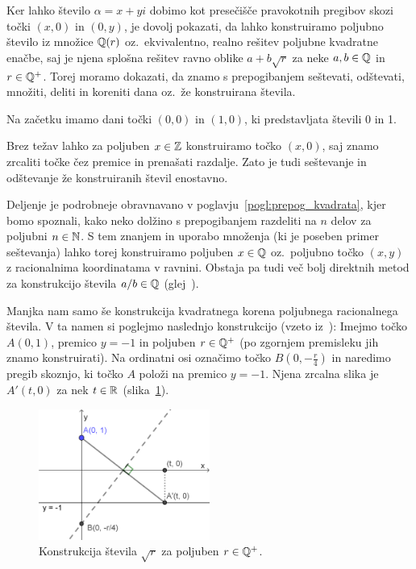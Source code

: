 \begin{dokaz}
    Ker lahko število $\alpha = x + y i$ dobimo kot presečišče pravokotnih pregibov skozi točki $(x, 0)$ in $(0, y)$, je dovolj pokazati, da lahko konstruiramo poljubno število iz množice $\mathbb Q(r)$ oz.\ ekvivalentno, realno rešitev poljubne kvadratne enačbe, saj je njena splošna rešitev ravno oblike $a + b\sqrt{r} $ za neke $ a, b \in \mathbb Q$ in $r \in \mathbb Q^{+}$. Torej moramo dokazati, da znamo s prepogibanjem seštevati, odštevati, množiti, deliti in koreniti dana oz.\ že konstruirana števila.
    
    Na začetku imamo dani točki $(0, 0)$ in $(1, 0)$, ki predstavljata števili 0 in 1. 
    
    
    Brez težav lahko za poljuben $x \in \mathbb Z$ konstruiramo točko $(x, 0)$, saj znamo zrcaliti točke čez premice in prenašati razdalje. Zato je tudi seštevanje in odštevanje že konstruiranih števil enostavno.




    Deljenje je podrobneje obravnavano v poglavju~\ref{pogl:prepog_kvadrata}, kjer bomo spoznali, kako neko dolžino s prepogibanjem razdeliti na $n$ delov za poljubni $n \in \mathbb N$. S tem znanjem in uporabo množenja (ki je poseben primer seštevanja) lahko torej konstruiramo poljuben $x \in \mathbb Q$ oz.\ poljubno točko $(x, y)$ z racionalnima koordinatama v ravnini. Obstaja pa tudi več bolj direktnih metod za konstrukcijo števila $a/b \in \mathbb Q$ (glej~\cite[str.\ 12--21]{lang2013}).
    
    Manjka nam samo še konstrukcija kvadratnega korena poljubnega racionalnega števila. V ta namen si poglejmo naslednjo konstrukcijo (vzeto iz~\cite[str.\ 58]{hull2013}):
    Imejmo točko $A (0, 1) $, premico $y = -1$ in poljuben $r \in \mathbb Q^{+}$ (po zgornjem premisleku jih znamo konstruirati). Na ordinatni osi označimo točko $B (0, -\frac{r}{4})$ in naredimo pregib skoznjo, ki točko $A$ položi na premico $y = -1$. Njena zrcalna slika je $A' (t, 0) $ za nek $t \in \mathbb R$ (slika~\ref{fig:konstrukcija_korena}).
    
    \begin{figure}[h]
        \centering
        \includegraphics[width=0.5\textwidth]{images/kvadratni_koren.png}
        \caption[Konstrukcija korena]{Konstrukcija števila $\sqrt{r}$ za poljuben $r \in \mathbb Q^{+}$.}
        \label{fig:konstrukcija_korena}
    \end{figure}
    

\end{dokaz}
